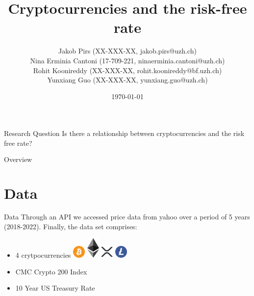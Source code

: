 \documentclass[11pt]{beamer}
\author{\small Jakob Pirs (XX-XXX-XX, jakob.pirs@uzh.ch)\\
Nina Erminia Cantoni (17-709-221, ninaerminia.cantoni@uzh.ch)\\
Rohit Koonireddy (XX-XXX-XX, rohit.koonireddy@bf.uzh.ch)\\
Yunxiang Guo (XX-XXX-XX, yunxiang.guo@uzh.ch)\\}
\title{Cryptocurrencies and the risk-free rate}
\institute[]{University of Zurich, Department of Banking and Finance}
\date{\today}
\begin{document}
\begin{frame}
\titlepage
\end{frame}


\begin{frame}{Research Question}
 \centering Is there a relationship between cryptocurrencies and the risk free rate?
\end{frame}

\begin{frame}{Overview}
\tableofcontents 
\end{frame}


\section{Data}
\begin{frame}{Data}
Through an API we accessed price data from yahoo over a period of 5 years (2018-2022). Finally, the data set comprises:
 \begin{itemize}
        \item 4 crytpocurrencies \includegraphics[width=0.05\textwidth]{Bitcoin.png} \includegraphics[width=0.05\textwidth]{ETH.png} \includegraphics[width=0.05\textwidth]{XRP.png} \includegraphics[width=0.05\textwidth]{LTC.png}
        
        \medskip
        
        \item CMC Crypto 200 Index
        
        \medskip
        
        \item 10 Year US Treasury Rate
    \end{itemize}

\end{frame}
\end{document}

